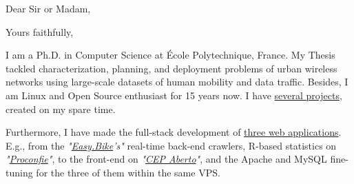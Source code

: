 \date{\today}
\opening{Dear Sir or Madam,}
\closing{Yours faithfully,}
\makelettertitle

I am a Ph.D. in Computer Science at École Polytechnique, France. My Thesis tackled characterization, planning, and deployment problems of urban wireless networks using large-scale datasets of human mobility and data traffic. Besides, I am Linux and Open Source enthusiast for 15 years now. I have \hyperref[sec:open_source]{several projects}, created on my spare time.

Furthermore, I have made the full-stack development of \hyperref[sec:web_app]{three web applications}. E.g., from the \textit{"\href{http://easy.bike}{Easy.Bike}'s"} real-time back-end crawlers, R-based statistics on \textit{"\href{http://www.proconfie.com}{Proconfie}"}, to the front-end on \textit{"\href{http://www.cepaberto.com}{CEP Aberto}"}, and the Apache and MySQL fine-tuning for the three of them within the same VPS.



